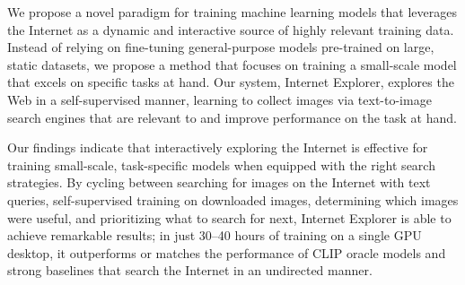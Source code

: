 

We propose a novel paradigm for training machine learning models that leverages the Internet as a dynamic and interactive source of highly relevant training data. Instead of relying on fine-tuning general-purpose models pre-trained on large, static datasets, we propose a method that focuses on training a small-scale model that excels on specific tasks at hand. Our system, Internet Explorer, explores the Web in a self-supervised manner, learning to collect images via text-to-image search engines that are relevant to and improve performance on the task at hand.

Our findings indicate that interactively exploring the Internet is effective for training small-scale, task-specific models when equipped with the right search strategies.
By cycling between searching for images on the Internet with text queries, self-supervised training on downloaded images, determining which images were useful, and prioritizing what to search for next, Internet Explorer is able to achieve remarkable results; in just 30--40 hours of training on a single GPU desktop, it outperforms or matches the performance of CLIP oracle models and strong baselines that search the Internet in an undirected manner.

